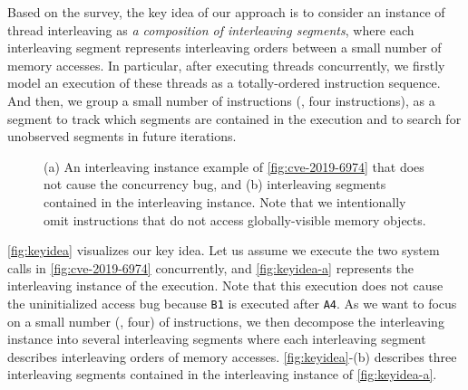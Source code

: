 %
Based on the survey, the key idea of our approach is to consider an
instance of thread interleaving as \textit{a composition of
  interleaving segments}, where each interleaving segment represents
interleaving orders between a small number of memory accesses.
%
In particular, after executing threads concurrently, we firstly model
an execution of these threads as a totally-ordered instruction
sequence.
%
And then, we group a small number of instructions (\eg, four
instructions), as a segment to track which segments are contained in
the execution and to search for unobserved segments in future
iterations.

\begin{figure}[t]
  \hfill
  \caption{(a) An interleaving instance example of
    \autoref{fig:cve-2019-6974} that does not cause the concurrency
    bug, and (b) interleaving segments contained in the interleaving
    instance. Note that we intentionally omit instructions that do not
    access globally-visible memory objects.}
  \label{fig:keyidea}
\end{figure}
%
\autoref{fig:keyidea} visualizes our key idea.
%
Let us assume we execute the two system calls in
\autoref{fig:cve-2019-6974} concurrently, and \autoref{fig:keyidea-a}
represents the interleaving instance of the execution. Note that this
execution does not cause the uninitialized access bug because
\texttt{B1} is executed after \texttt{A4}.
%
As we want to focus on a small number (\eg, four) of instructions, we
then decompose the interleaving instance into several interleaving
segments where each interleaving segment describes interleaving orders
of memory accesses.
%
\autoref{fig:keyidea}-(b) describes three interleaving segments
contained in the interleaving instance of \autoref{fig:keyidea-a}.
%

